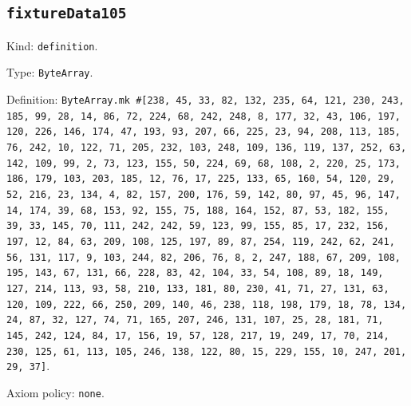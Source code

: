 \documentclass[11pt]{article}
\begin{document}
\subsection*{\texttt{fixtureData105}}
\noindent Kind: \texttt{definition}.\par
\noindent Type: \texttt{ByteArray}.\par
\noindent Definition: \texttt{ByteArray.mk \#[238, 45, 33, 82, 132, 235, 64, 121, 230, 243, 185, 99, 28, 14, 86, 72, 224, 68, 242, 248, 8, 177, 32, 43, 106, 197, 120, 226, 146, 174, 47, 193, 93, 207, 66, 225, 23, 94, 208, 113, 185, 76, 242, 10, 122, 71, 205, 232, 103, 248, 109, 136, 119, 137, 252, 63, 142, 109, 99, 2, 73, 123, 155, 50, 224, 69, 68, 108, 2, 220, 25, 173, 186, 179, 103, 203, 185, 12, 76, 17, 225, 133, 65, 160, 54, 120, 29, 52, 216, 23, 134, 4, 82, 157, 200, 176, 59, 142, 80, 97, 45, 96, 147, 14, 174, 39, 68, 153, 92, 155, 75, 188, 164, 152, 87, 53, 182, 155, 39, 33, 145, 70, 111, 242, 242, 59, 123, 99, 155, 85, 17, 232, 156, 197, 12, 84, 63, 209, 108, 125, 197, 89, 87, 254, 119, 242, 62, 241, 56, 131, 117, 9, 103, 244, 82, 206, 76, 8, 2, 247, 188, 67, 209, 108, 195, 143, 67, 131, 66, 228, 83, 42, 104, 33, 54, 108, 89, 18, 149, 127, 214, 113, 93, 58, 210, 133, 181, 80, 230, 41, 71, 27, 131, 63, 120, 109, 222, 66, 250, 209, 140, 46, 238, 118, 198, 179, 18, 78, 134, 24, 87, 32, 127, 74, 71, 165, 207, 246, 131, 107, 25, 28, 181, 71, 145, 242, 124, 84, 17, 156, 19, 57, 128, 217, 19, 249, 17, 70, 214, 230, 125, 61, 113, 105, 246, 138, 122, 80, 15, 229, 155, 10, 247, 201, 29, 37]}.\par
\noindent Axiom policy: \texttt{none}.\par
\end{document}
